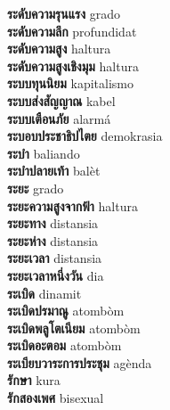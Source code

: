 \textbf{ ระดับความรุนแรง  } grado \\
\textbf{ ระดับความลึก  } profundidat \\
\textbf{ ระดับความสูง  } haltura \\
\textbf{ ระดับความสูงเชิงมุม  } haltura \\
\textbf{ ระบบทุนนิยม  } kapitalismo \\
\textbf{ ระบบส่งสัญญาณ  } kabel \\
\textbf{ ระบบเตือนภัย  } alarmá \\
\textbf{ ระบอบประชาธิปไตย  } demokrasia \\
\textbf{ ระบำ  } baliando \\
\textbf{ ระบำปลายเท้า  } balèt \\
\textbf{ ระยะ  } grado \\
\textbf{ ระยะความสูงจากฟ้า  } haltura \\
\textbf{ ระยะทาง  } distansia \\
\textbf{ ระยะห่าง  } distansia \\
\textbf{ ระยะเวลา  } distansia \\
\textbf{ ระยะเวลาหนึ่งวัน  } dia \\
\textbf{ ระเบิด  } dinamit \\
\textbf{ ระเบิดปรมาณู  } atombòm \\
\textbf{ ระเบิดพลูโตเนียม  } atombòm \\
\textbf{ ระเบิดอะตอม  } atombòm \\
\textbf{ ระเบียบวาระการประชุม  } agènda \\
\textbf{ รักษา  } kura \\
\textbf{ รักสองเพศ  } bisexual \\
